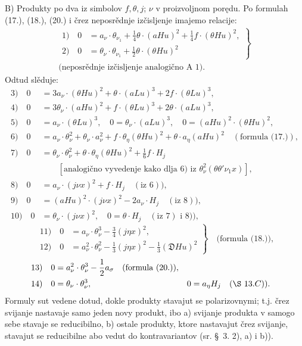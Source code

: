 \documentclass[11pt]{article}
\newcommand{\D}{\mathfrak D}
\begin{document}
\mbox{B)} Produkty po dva iz simbolov $f,\theta,j$; $\nu$ v proizvoljnom porędu. Po formulah (17.), (18.), (20.) i črez neposrědnje izčisljenje imajemo relacije:
\[
\begin{gathered}
\left.
\begin{aligned}
1)\quad 0&=a_\nu\cdot\theta_{\nu_1}+\frac14\theta\cdot(aHu)^2+\frac14f\cdot(\theta Hu)^2,\\
2)\quad 0&=\theta_\nu\cdot\theta_{\nu_1}+\frac12\theta\cdot(\theta Hu)^2
\end{aligned}
\right\}\\[-0.2em]
\text{(neposrědnje izčisljenje analogično A 1).}
\end{gathered}
\]
Odtud slěduje:
\begin{align*}
3)\quad 0&=3a_\nu\cdot(\theta Hu)^2+\theta\cdot(aLu)^3+2f\cdot(\theta Lu)^3,\\
4)\quad 0&=3\theta_\nu\cdot(aHu)^2+f\cdot(\theta Lu)^3+2\theta\cdot(aLu)^3,\\
5)\quad 0&=a_\nu\cdot(\theta Lu)^3,\quad 0=\theta_\nu\cdot(aLu)^3,\quad 0=(aHu)^2\cdot(\theta Hu)^2,\\
6)\quad 0&=a_\nu\cdot\theta_\nu^2+\theta_\nu\cdot a_\nu^2+f\cdot\theta_\eta(\theta Hu)^2+\theta\cdot a_\eta(aHu)^2\quad(\text{formula (17.)}),\\
7)\quad 0&=\theta_\nu\cdot\theta_\nu^2+\theta\cdot\theta_\eta(\theta Hu)^2+\frac16f\cdot H_j\\
&\qquad [\text{analogično vyvedenje kako dlja }6)\text{ iz }\theta_\nu^2(\theta\theta'\nu_1x)],\\
8)\quad 0&=a_\nu\cdot(j\nu x)^2+f\cdot H_j\quad(\text{iz }6)),\\
9)\quad 0&=(aHu)^2\cdot(j\nu x)^2-2a_\nu\cdot H_j\quad(\text{iz }8)),\\
10)\quad 0&=\theta_\nu\cdot(j\nu x)^2,\quad 0=\theta\cdot H_j\quad(\text{iz }7)\text{ i }8)),
\end{align*}
\[
\left.
\begin{aligned}
11)\quad 0&=a_\nu\cdot\theta_\nu^3-\frac34(j\eta x)^2,\\
12)\quad 0&=a_\nu^2\cdot\theta_\nu^2-\frac13(j\eta x)^2-\frac13(\D Hu)^2
\end{aligned}
\right\}\quad\text{(formula (18.)),}
\]
\begin{align*}
13)\quad 0&=a_\nu^2\cdot\theta_\nu^3-\frac12a_\sigma\quad(\text{formula (20.)}),\\
14)\quad 0&=\theta_\nu\cdot\theta_\nu^3,
&0&=a_\eta H_j\quad(\S\ 13. C)).
\end{align*}
Formuly sut vedene dotud, dokle produkty stavajut se polarizovnymi; t.j. črez svijanje nastavaje samo jeden novy produkt, ibo \mbox{a)} svijanje produkta v samogo sebe stavaje se reducibilno, \mbox{b)} ostale produkty, ktore nastavajut črez svijanje, stavajut se reducibilne abo vedut do kontravariantov (sr. \S\ 3. \mbox{2)}, \mbox{a)} i \mbox{b)}).
\end{document}
